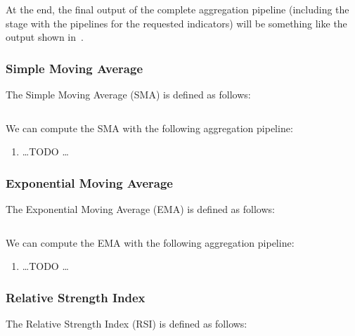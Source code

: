 At the end, the final output of the complete aggregation pipeline (including the
 stage with the pipelines for the requested indicators) will be
something like the output shown in~.



\subsubsection{Simple Moving Average}

The Simple Moving Average (SMA) is defined as follows:

\begin{equation}\label{eq:sma}
\end{equation}

We can compute the SMA with the following aggregation pipeline:

\begin{enumerate}
	\item \ldots TODO \ldots
\end{enumerate}

\subsubsection{Exponential Moving Average}

The Exponential Moving Average (EMA) is defined as follows:

\begin{equation}\label{eq:ema}
\end{equation}

We can compute the EMA with the following aggregation pipeline:

\begin{enumerate}
	\item \ldots TODO \ldots
\end{enumerate}

\subsubsection{Relative Strength Index}

The Relative Strength Index (RSI) is defined as follows:

\begin{equation}\label{eq:rsi}
\end{equation}

